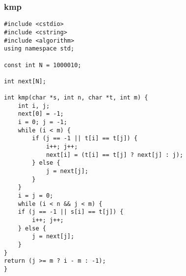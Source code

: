 \subsubsection{kmp}
\begin{verbatim}
#include <cstdio>
#include <cstring>
#include <algorithm>
using namespace std;

const int N = 1000010;

int next[N];

int kmp(char *s, int n, char *t, int m) {
    int i, j;
    next[0] = -1;
    i = 0; j = -1;
    while (i < m) {
        if (j == -1 || t[i] == t[j]) {
            i++; j++;
            next[i] = (t[i] == t[j] ? next[j] : j);
        } else {
            j = next[j];
        }
    }
    i = j = 0;
    while (i < n && j < m) {
    if (j == -1 || s[i] == t[j]) {
        i++; j++;
    } else {
        j = next[j];
    }
}
return (j >= m ? i - m : -1);
}
\end{verbatim}
